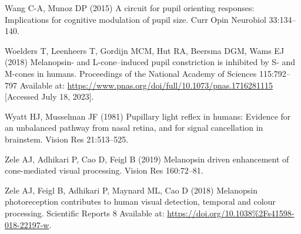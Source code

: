 \documentclass[
]{article}
\begin{document}
\leavevmode\hypertarget{ref-Wang2015}{}%
Wang C-A, Munoz DP (2015) A circuit for pupil orienting responses: Implications for cognitive modulation of pupil size. Curr Opin Neurobiol 33:134--140.

\leavevmode\hypertarget{ref-Woelders2018}{}%
Woelders T, Leenheers T, Gordijn MCM, Hut RA, Beersma DGM, Wams EJ (2018) Melanopsin- and L-cone--induced pupil constriction is inhibited by S- and M-cones in humans. Proceedings of the National Academy of Sciences 115:792--797 Available at: \url{https://www.pnas.org/doi/full/10.1073/pnas.1716281115} {[}Accessed July 18, 2023{]}.

\leavevmode\hypertarget{ref-Wyatt1981}{}%
Wyatt HJ, Musselman JF (1981) Pupillary light reflex in humans: Evidence for an unbalanced pathway from nasal retina, and for signal cancellation in brainstem. Vision Res 21:513--525.

\leavevmode\hypertarget{ref-Zele2019}{}%
Zele AJ, Adhikari P, Cao D, Feigl B (2019) Melanopsin driven enhancement of cone-mediated visual processing. Vision Res 160:72--81.

\leavevmode\hypertarget{ref-Zele2018}{}%
Zele AJ, Feigl B, Adhikari P, Maynard ML, Cao D (2018) Melanopsin photoreception contributes to human visual detection, temporal and colour processing. Scientific Reports 8 Available at: \url{https://doi.org/10.1038\%2Fs41598-018-22197-w}.
\end{document}
